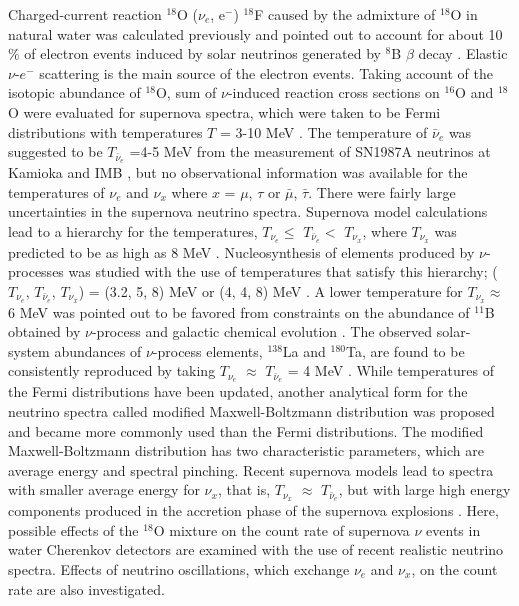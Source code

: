 \documentclass[preprint,12pt]{elsarticle}
\begin{document}
Charged-current reaction $^{18}$O ($\nu_e$, e$^{-}$) $^{18}$F caused by the admixture of $^{18}$O in natural water was calculated previously and pointed out to account for about 10$\%$ of electron events  
induced by solar neutrinos generated by $^{8}$B $\beta$ decay \cite{Haxton}.
Elastic $\nu$-$e^{-}$ scattering is the main source of the electron events.
Taking account of the isotopic abundance of $^{18}$O, sum of $\nu$-induced reaction cross sections on $^{16}$O and $^{18}$O were evaluated for supernova spectra, which were taken to be Fermi distributions with temperatures $T$ = 3-10 MeV \cite{Haxton}.
The temperature of $\bar{\nu}_e$ was suggested to be $T_{\bar{\nu}_e}$ =4-5 MeV from the measurement of SN1987A neutrinos at Kamioka \cite{Kamioka} and IMB \cite{IMB}, but no observational information was available for the temperatures of $\nu_e$ and $\nu_x$ where $x$ = $\mu$, $\tau$ or $\bar{\mu}$, $\bar{\tau}$. 
There were fairly large uncertainties in the supernova neutrino spectra.
Supernova model calculations lead to a hierarchy for the temperatures, $T_{\nu_e} \leq$ $T_{\bar{\nu}_e}<$ $T_{\nu_x}$, where $T_{\nu_x}$ was predicted to be as high as 8 MeV \cite{Wilson}.
Nucleosynthesis of elements produced by $\nu$-processes was studied with the use of temperatures that satisfy this hierarchy;
($T_{\nu_e}$, $T_{\bar{\nu}_e}$, $T_{\nu_x}$) = (3.2, 5, 8) MeV \cite{Woosley} or (4, 4, 8) MeV \cite{WW95}.
A lower temperature for $T_{\nu_x}\approx$ 6 MeV was pointed out to be favored from
constraints on the abundance of $^{11}$B 
obtained by $\nu$-process and galactic chemical evolution \cite{Yoshida2005,Yoshida2006}. 
The observed solar-system abundances of $\nu$-process elements, $^{138}$La and $^{180}$Ta, are found to be consistently reproduced by taking $T_{\nu_e}$ $\approx$ $T_{\bar{\nu}_e}$ = 4 MeV \cite{Hayakawa1,Hayakawa2}. 
While temperatures of the Fermi distributions have been updated, another analytical form for the neutrino spectra  
called modified Maxwell-Boltzmann distribution 
was proposed \cite{KRJ} and became more commonly used than the Fermi distributions.
The modified Maxwell-Boltzmann distribution has two characteristic parameters, which are average energy and spectral pinching.
Recent supernova models lead to spectra with smaller average energy for $\nu_x$, that is, $T_{\nu_x}$ $\approx$ $T_{\bar{\nu}_e}$, but with large high energy components produced in the accretion phase of the supernova explosions \cite{Naka2013,Siverding1,Siverding2}.  
Here, possible effects of the $^{18}$O mixture on the count rate of supernova $\nu$ events in water Cherenkov detectors are examined with the use of recent realistic neutrino spectra.
Effects of neutrino oscillations,  
which exchange $\nu_e$ and $\nu_x$, on the count rate are also investigated.
\end{document}
